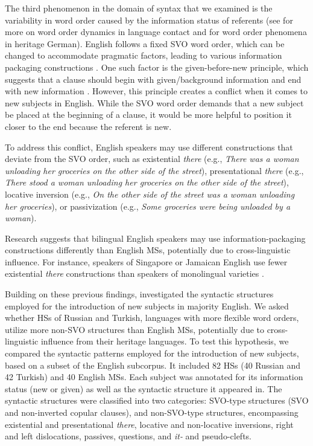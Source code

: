 \documentclass[output=paper,colorlinks,citecolor=brown]{langscibook}
\begin{document}
The third phenomenon in the domain of syntax that we examined is the variability in word order caused by the information status of referents (see  for more on word order dynamics in language contact and  for word order phenomena in heritage German). English follows a fixed SVO word order, which can be changed to accommodate pragmatic factors, leading to various information packaging constructions \parencite[67--68]{Huddleston2002}. One such factor is the given-before-new principle, which suggests that a clause should begin with given/background information and end with new information \parencite[888--889]{Biber2021grammar}. However, this principle creates a conflict when it comes to new subjects in English. While the SVO word order demands that a new subject be placed at the beginning of a clause, it would be more helpful to position it closer to the end because the referent is new.

To address this conflict, English speakers may use different constructions that deviate from the SVO order, such as existential \textit{there} {(e.g.,} {\textit{There was a woman unloading her groceries on the other side of the street}}), presentational \textit{there} (e.g., {\textit{There stood a woman unloading her groceries on the other side of the street}}), locative inversion (e.g., {\textit{On the other side of the street was a woman unloading her groceries}}), or passivization (e.g., \textit{Some groceries were being unloaded by a woman}).

{Research suggests that bilingual English speakers may use information\hyp packaging constructions differently than English MSs, potentially due to cross-linguistic influence. For instance, speakers of Singapore or Jamaican English use fewer existential} \textit{there} constructions than speakers of monolingual varieties \parencite{Winkle2015}.

{Building on these previous findings, \citet{pashkovainprep_c} investigated the syntactic structures employed for the introduction of new subjects in majority English. We asked whether HSs of Russian and Turkish, languages with more flexible word orders, utilize more non-SVO structures than English MSs, potentially due to cross-linguistic influence from their heritage languages. To test this hypothesis, we compared the syntactic patterns employed for the introduction of new subjects, based on a subset of the English subcorpus. It included 82 HSs (40 Russian and 42 Turkish) and 40 English MSs. Each subject was annotated for its information status (new or given) as well as the syntactic structure it appeared in. The syntactic structures were classified into two categories: SVO-type structures (SVO and non-inverted copular clauses), and non-SVO-type structures, encompassing existential and presentational} \textit{there}, locative and non-locative inversions, right and left dislocations, passives, questions, and \textit{it-} and pseudo-clefts.
\end{document}
